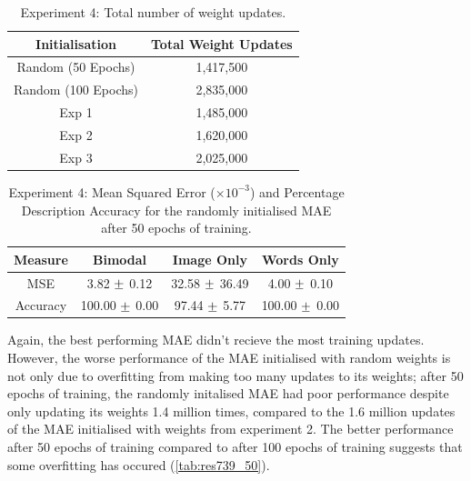 \begin{table}
\centering
\begin{tabular}{|c|c|}
\hline
\textbf{Initialisation} & \textbf{Total Weight Updates}\\ \hline
Random (50 Epochs) &  1,417,500\\ \hline
Random (100 Epochs) & 2,835,000\\ \hline
Exp 1 & 1,485,000\\ \hline
Exp 2 & 1,620,000\\ \hline
Exp 3 &	2,025,000\\ \hline

\end{tabular}
\caption{Experiment 4: Total number of weight updates.}
\label{tab:updatesTotal4}
\end{table}

\begin{table}[h!]
\centering
\begin{tabular}{|c|c|c|c|}
	\hline
	\textbf{Measure} & 	\textbf{Bimodal} & 	\textbf{Image Only} 	& 	\textbf{Words Only} \\ \hline
MSE	&	3.82	$\mypm$	0.12	&	32.58	$\mypm$	36.49	&	4.00	$\mypm$	0.10	\\ \hline
Accuracy	&	100.00	$\mypm$	0.00	&	97.44	$\mypm$	5.77	&	100.00	$\mypm$	0.00\\ \hline
\end{tabular}

\caption{Experiment 4: Mean Squared Error ($\times10^{-3}$) and Percentage Description Accuracy for the randomly initialised MAE after 50 epochs of training.} 
\label{tab:res739_50}
\end{table}

Again, the best performing \ac{MAE} didn't recieve the most training updates. However, the worse performance of the \ac{MAE} initialised with random weights is not only due to overfitting from making too many updates to its weights; after 50 epochs of training, the randomly initalised MAE had poor performance despite only updating its weights 1.4 million times, compared to the 1.6 million updates of the \ac{MAE} initialised with weights from experiment 2. The better performance after 50 epochs  of training compared to after 100 epochs of training suggests that some overfitting has occured (\autoref{tab:res739_50}).



